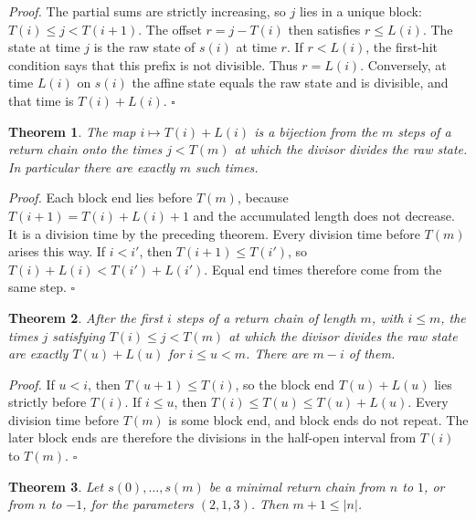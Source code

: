 \documentclass[11pt,letterpaper]{article}
\newtheorem{theorem}{Theorem}
\newenvironment{proof}{\noindent\textit{Proof.}}{\hfill\(\square\)}
\begin{document}
\begin{proof}
The partial sums are strictly increasing, so \(j\) lies in a unique block: \(T(i)\le j<T(i+1)\). The offset \(r=j-T(i)\) then satisfies \(r\le L(i)\). The state at time \(j\) is the raw state of \(s(i)\) at time \(r\). If \(r<L(i)\), the first-hit condition says that this prefix is not divisible. Thus \(r=L(i)\). Conversely, at time \(L(i)\) on \(s(i)\) the affine state equals the raw state and is divisible, and that time is \(T(i)+L(i)\).
\end{proof}

\begin{theorem}
\label{thm:divisioncount}
The map \(i\mapsto T(i)+L(i)\) is a bijection from the \(m\) steps of a return chain onto the times \(j<T(m)\) at which the divisor divides the raw state. In particular there are exactly \(m\) such times.
\end{theorem}

\begin{proof}
Each block end lies before \(T(m)\), because \(T(i+1)=T(i)+L(i)+1\) and the accumulated length does not decrease. It is a division time by the preceding theorem. Every division time before \(T(m)\) arises this way. If \(i<i'\), then \(T(i+1)\le T(i')\), so \(T(i)+L(i)<T(i')+L(i')\). Equal end times therefore come from the same step.
\end{proof}

\begin{theorem}
\label{thm:remaining}
After the first \(i\) steps of a return chain of length \(m\), with \(i\le m\), the times \(j\) satisfying \(T(i)\le j<T(m)\) at which the divisor divides the raw state are exactly \(T(u)+L(u)\) for \(i\le u<m\). There are \(m-i\) of them.
\end{theorem}

\begin{proof}
If \(u<i\), then \(T(u+1)\le T(i)\), so the block end \(T(u)+L(u)\) lies strictly before \(T(i)\). If \(i\le u\), then \(T(i)\le T(u)\le T(u)+L(u)\). Every division time before \(T(m)\) is some block end, and block ends do not repeat. The later block ends are therefore the divisions in the half-open interval from \(T(i)\) to \(T(m)\).
\end{proof}

\begin{theorem}
\label{thm:abscount}
Let \(s(0),\ldots,s(m)\) be a minimal return chain from \(n\) to \(1\), or from \(n\) to \(-1\), for the parameters \((2,1,3)\). Then \(m+1\le |n|\).
\end{theorem}
\end{document}
